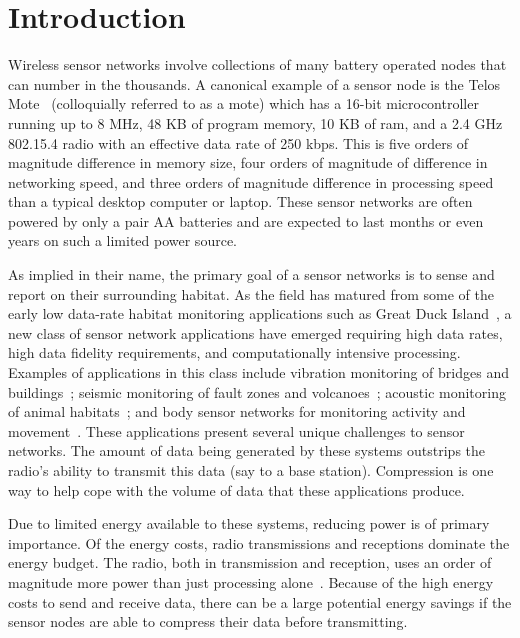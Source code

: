 \section{Introduction} 

Wireless sensor networks involve collections of many battery operated
nodes that can number in the thousands.  A canonical example of a
sensor node is the Telos Mote~\cite{telos} (colloquially referred to
as a mote) which has a 16-bit microcontroller running up to 8 MHz, 48
KB of program memory, 10 KB of ram, and a 2.4 GHz 802.15.4 radio with
an effective data rate of 250 kbps.  This is five orders of magnitude
difference in memory size, four orders of magnitude of difference in
networking speed, and three orders of magnitude difference in
processing speed than a typical desktop computer or laptop.  These
sensor networks are often powered by only a pair AA batteries and are
expected to last months or even years on such a limited power source.

As implied in their name, the primary goal of a sensor networks is to
sense and report on their surrounding habitat. As the field has
matured from some of the early low data-rate habitat monitoring
applications such as Great Duck Island~\cite{gdi-sensys04}, a new
class of sensor network applications have emerged requiring high data
rates, high data fidelity requirements, and computationally intensive
processing. Examples of applications in this class include vibration
monitoring of bridges and
buildings~\cite{brimon,netshm-spots06,ggb-monitoring}; seismic
monitoring of fault zones and
volcanoes~\cite{ucla-seismic,volcano-osdi06}; acoustic monitoring of
animal habitats~\cite{girod-marmots,enviromic}; and body sensor
networks for monitoring activity and
movement~\cite{intel-msp,satire,parkinsons-embs07}.  These
applications present several unique challenges to sensor networks.
The amount of data being generated by these systems outstrips the
radio's ability to transmit this data (say to a base station).
Compression is one way to help cope with the volume of data that these
applications produce.  

Due to limited energy available to these systems, reducing power is of
primary importance.  Of the energy costs, radio transmissions and
receptions dominate the energy budget.  The radio, both in
transmission and reception, uses an order of magnitude more power than
just processing alone~\cite{telos}.  Because of the high energy costs
to send and receive data, there can be a large potential energy
savings if the sensor nodes are able to compress their data before
transmitting.

